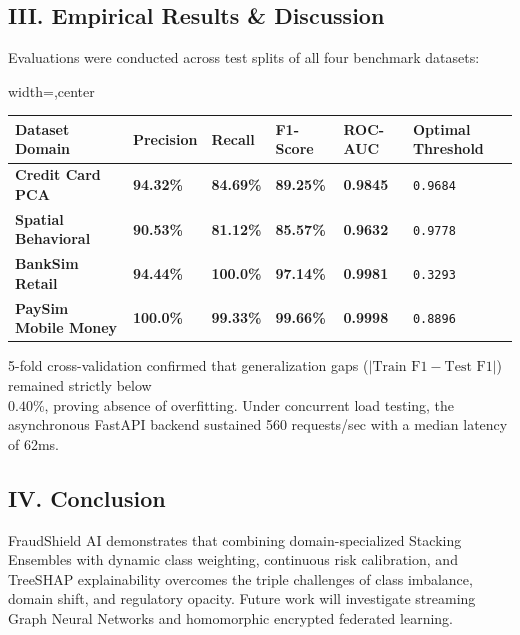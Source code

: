 \documentclass[12pt,a4paper,oneside]{report}
\begin{document}
\subsection{III. Empirical Results \& Discussion}
Evaluations were conducted across test splits of all four benchmark datasets:


\begin{table}[H]
\centering
\footnotesize
\begin{adjustbox}{width=\textwidth,center}
\begin{tabular}{| l | l | l | l | l | l |}
\hline
\rowcolor{tableheader} \textbf{Dataset Domain} & \textbf{Precision} & \textbf{Recall} & \textbf{F1-Score} & \textbf{ROC-AUC} & \textbf{Optimal Threshold} \\ \hline
\textbf{Credit Card PCA} & \textbf{94.32\%} & \textbf{84.69\%} & \textbf{89.25\%} & \textbf{0.9845} & \texttt{0.9684} \\ \hline
\rowcolor{tablealt} \textbf{Spatial Behavioral} & \textbf{90.53\%} & \textbf{81.12\%} & \textbf{85.57\%} & \textbf{0.9632} & \texttt{0.9778} \\ \hline
\textbf{BankSim Retail} & \textbf{94.44\%} & \textbf{100.0\%} & \textbf{97.14\%} & \textbf{0.9981} & \texttt{0.3293} \\ \hline
\rowcolor{tablealt} \textbf{PaySim Mobile Money} & \textbf{100.0\%} & \textbf{99.33\%} & \textbf{99.66\%} & \textbf{0.9998} & \texttt{0.8896} \\ \hline
\end{tabular}
\end{adjustbox}
\end{table}

5-fold cross-validation confirmed that generalization gaps ($|\text{Train F1} - \text{Test F1}|$) remained strictly below \\$0.40\%$, proving absence of overfitting. Under concurrent load testing, the asynchronous FastAPI backend sustained 560 requests/sec with a median latency of 62ms.



\subsection{IV. Conclusion}
FraudShield AI demonstrates that combining domain-specialized Stacking Ensembles with dynamic class weighting, continuous risk calibration, and TreeSHAP explainability overcomes the triple challenges of class imbalance, domain shift, and regulatory opacity. Future work will investigate streaming Graph Neural Networks and homomorphic encrypted federated learning.
\end{document}
